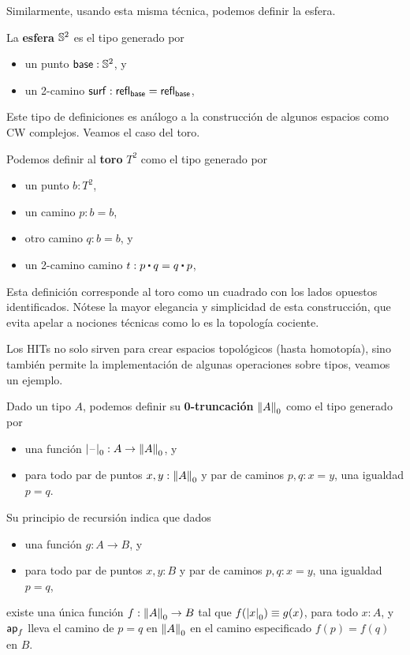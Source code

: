 \documentclass[../main.tex]{subfiles}
\begin{document}
Similarmente, usando esta misma t\'ecnica, podemos definir la esfera.
\begin{definition}
  La \textbf{esfera} $\Sn^2$ es el tipo generado por
  \begin{itemize}
    \item un punto $\base : \Sn^2$, y
    \item un 2-camino $\mathsf{surf} : \refl{\base}=\refl{\base}$,
  \end{itemize}
\end{definition}

Este tipo de definiciones es an\'alogo a la construcci\'on de algunos espacios como CW complejos. Veamos el caso del toro.
\begin{definition}
  Podemos definir al \textbf{toro} $T^2$ como el tipo generado por
  \begin{itemize}
    \item un punto $b : T^2$,
    \item un camino $p:b=b$,
    \item otro camino $q:b=b$, y
    \item un 2-camino camino $t:p\ct q= q \ct p$,
  \end{itemize}
\end{definition}
Esta definici\'on corresponde al toro como un cuadrado con los lados opuestos identificados. N\'otese la mayor elegancia y simplicidad de esta construcci\'on, que evita apelar a nociones t\'ecnicas como lo es la topolog\'ia cociente.

Los HITs no solo sirven para crear espacios topol\'ogicos (hasta homotop\'ia), sino tambi\'en permite la implementaci\'on de algunas operaciones sobre tipos, veamos un ejemplo.

\begin{definition}
  Dado un tipo $A$, podemos definir su \textbf{0-truncaci\'on} $\trunc0 A$ como el tipo generado por
  \begin{itemize}
    \item una funci\'on $\tprojf0 : A \to \trunc0 A$, y
    \item para todo par de puntos $x,y:\trunc0A$ y par de caminos $p,q:x=y$, una igualdad $p=q$.
  \end{itemize}
  Su principio de recursi\'on indica que dados
  \begin{itemize}
    \item una funci\'on $g: A \to B$, y
    \item para todo par de puntos $x,y:B$ y par de caminos $p,q:x=y$, una igualdad $p=q$,
  \end{itemize}
  existe una \'unica funci\'on $f: \trunc0 A \to B$ tal que $f(\tproj0x) \jdeq g(x)$, para todo $x:A$, y $\apfunc{f}$ lleva el camino de $p=q$ en $\trunc0 A$ en el camino especificado $f(p)=f(q)$ en $B$.
\end{definition}
\end{document}
